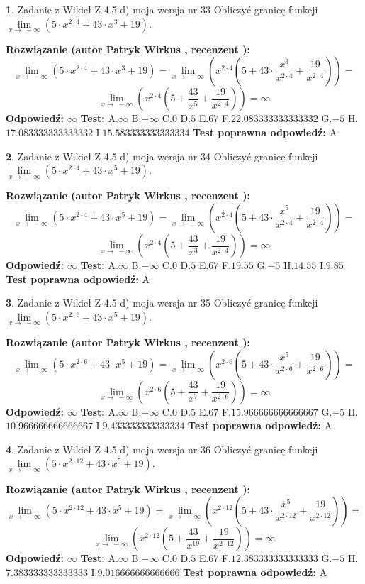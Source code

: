 \documentclass[12pt, a4paper]{article}
\theoremstyle{definition} %
\newtheorem{zad}{}
\newcommand{\zadStart}[1]{\begin{zad}#1\newline}
\newcommand{\zadStop}{\end{zad}}
\newcommand{\rozwStart}[2]{\noindent \textbf{Rozwiązanie (autor #1 , recenzent #2): }\newline}
\newcommand{\rozwStop}{\newline}
\newcommand{\odpStart}{\noindent \textbf{Odpowiedź:}\newline}
\newcommand{\odpStop}{\newline}
\newcommand{\testStart}{\noindent \textbf{Test:}\newline}
\newcommand{\testStop}{\newline}
\newcommand{\kluczStart}{\noindent \textbf{Test poprawna odpowiedź:}\newline}
\newcommand{\kluczStop}{\newline}
\begin{document}
\zadStart{Zadanie z Wikieł Z 4.5 d) moja wersja nr 33}
Obliczyć granicę funkcji  $\lim\limits_{x\to\ -\infty}(5 \cdot x^{2\cdot4}+43 \cdot x^{3}+19)$.
\zadStop
\rozwStart{Patryk Wirkus}{}
$$\lim\limits_{x\to\ -\infty}(5 \cdot x^{2\cdot4}+43 \cdot x^{3}+19) = \lim\limits_{x\to\ -\infty}(x^{2\cdot4}(5 +43 \cdot \frac{x^{3}}{x^{2\cdot4}}+\frac{19}{x^{2\cdot4}})) =$$ $$\lim\limits_{x\to\ -\infty}(x^{2\cdot4}(5 +\frac{43}{x^{5}}+\frac{19}{x^{2\cdot4}})) =\infty$$
\rozwStop
\odpStart
$\infty$
\odpStop
\testStart
A.$\infty$ B.$-\infty$ C.$0$ D.$5$ E.$67$
F.$22.083333333333332$ G.$-5$
H.$17.083333333333332$
I.$15.583333333333334$
\testStop
\kluczStart
A
\kluczStop



\zadStart{Zadanie z Wikieł Z 4.5 d) moja wersja nr 34}
Obliczyć granicę funkcji  $\lim\limits_{x\to\ -\infty}(5 \cdot x^{2\cdot4}+43 \cdot x^{5}+19)$.
\zadStop
\rozwStart{Patryk Wirkus}{}
$$\lim\limits_{x\to\ -\infty}(5 \cdot x^{2\cdot4}+43 \cdot x^{5}+19) = \lim\limits_{x\to\ -\infty}(x^{2\cdot4}(5 +43 \cdot \frac{x^{5}}{x^{2\cdot4}}+\frac{19}{x^{2\cdot4}})) =$$ $$\lim\limits_{x\to\ -\infty}(x^{2\cdot4}(5 +\frac{43}{x^{3}}+\frac{19}{x^{2\cdot4}})) =\infty$$
\rozwStop
\odpStart
$\infty$
\odpStop
\testStart
A.$\infty$ B.$-\infty$ C.$0$ D.$5$ E.$67$
F.$19.55$ G.$-5$
H.$14.55$
I.$9.85$
\testStop
\kluczStart
A
\kluczStop



\zadStart{Zadanie z Wikieł Z 4.5 d) moja wersja nr 35}
Obliczyć granicę funkcji  $\lim\limits_{x\to\ -\infty}(5 \cdot x^{2\cdot6}+43 \cdot x^{5}+19)$.
\zadStop
\rozwStart{Patryk Wirkus}{}
$$\lim\limits_{x\to\ -\infty}(5 \cdot x^{2\cdot6}+43 \cdot x^{5}+19) = \lim\limits_{x\to\ -\infty}(x^{2\cdot6}(5 +43 \cdot \frac{x^{5}}{x^{2\cdot6}}+\frac{19}{x^{2\cdot6}})) =$$ $$\lim\limits_{x\to\ -\infty}(x^{2\cdot6}(5 +\frac{43}{x^{7}}+\frac{19}{x^{2\cdot6}})) =\infty$$
\rozwStop
\odpStart
$\infty$
\odpStop
\testStart
A.$\infty$ B.$-\infty$ C.$0$ D.$5$ E.$67$
F.$15.966666666666667$ G.$-5$
H.$10.966666666666667$
I.$9.433333333333334$
\testStop
\kluczStart
A
\kluczStop



\zadStart{Zadanie z Wikieł Z 4.5 d) moja wersja nr 36}
Obliczyć granicę funkcji  $\lim\limits_{x\to\ -\infty}(5 \cdot x^{2\cdot12}+43 \cdot x^{5}+19)$.
\zadStop
\rozwStart{Patryk Wirkus}{}
$$\lim\limits_{x\to\ -\infty}(5 \cdot x^{2\cdot12}+43 \cdot x^{5}+19) = \lim\limits_{x\to\ -\infty}(x^{2\cdot12}(5 +43 \cdot \frac{x^{5}}{x^{2\cdot12}}+\frac{19}{x^{2\cdot12}})) =$$ $$\lim\limits_{x\to\ -\infty}(x^{2\cdot12}(5 +\frac{43}{x^{19}}+\frac{19}{x^{2\cdot12}})) =\infty$$
\rozwStop
\odpStart
$\infty$
\odpStop
\testStart
A.$\infty$ B.$-\infty$ C.$0$ D.$5$ E.$67$
F.$12.383333333333333$ G.$-5$
H.$7.383333333333333$
I.$9.016666666666666$
\testStop
\kluczStart
A
\kluczStop
\end{document}
